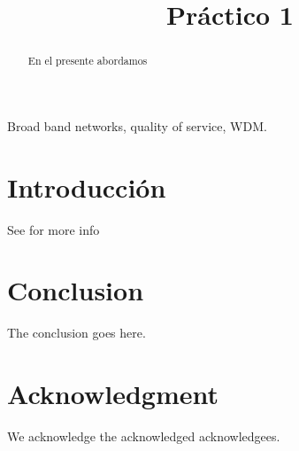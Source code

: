 \documentclass[9pt,conference]{IEEEtran}
\begin{document}
	\title{Pr\'actico 1}
	\author{
		\and
	}



	\maketitle

	\begin{abstract}
	En el presente abordamos 
	\end{abstract}
	\begin{IEEEkeywords}
	Broad band networks, quality of service, WDM.
	\end{IEEEkeywords}

	\section{Introducci\'on}
	See \cite{refmallba} for more info 	

	\section{Conclusion}
	The conclusion goes here.

	\section*{Acknowledgment}
	We acknowledge the acknowledged acknowledgees.



	
	{}
\end{document}

